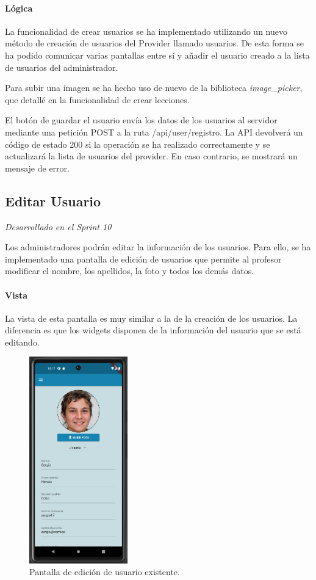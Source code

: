 \paragraph*{Lógica}
La funcionalidad de crear usuarios se ha implementado utilizando un nuevo método de creación de usuarios del Provider llamado usuarios. De esta forma
se ha podido comunicar varias pantallas entre sí y añadir el usuario creado a la lista de usuarios del administrador.


Para subir una imagen se ha hecho uso de nuevo de la biblioteca \textit{image\_picker}, que detallé en la funcionalidad de crear lecciones.

El botón de guardar el usuario envía los datos de los usuarios al servidor mediante una petición POST a la ruta /api/user/registro. La API devolverá un código de estado 200 si la operación se ha realizado correctamente y se actualizará la lista de usuarios del provider. En caso contrario, se mostrará un mensaje de error.


\subsection{Editar Usuario} 

\textit{Desarrollado en el Sprint 10}

Los administradores podrán editar la información de los usuarios. Para ello, se ha implementado una pantalla de edición de usuarios que permite al profesor modificar el nombre, los apellidos, la foto y todos los demás datos.

\paragraph*{Vista}
La vista de esta pantalla es muy similar a la de la creación de los usuarios. La diferencia es que los widgets disponen de la información del usuario que se está editando.

\begin{figure}[H]
  \centering
  \includegraphics[width=0.38\textwidth]{imagenes/c7/editarusuario.png}
  \caption{Pantalla de edición de usuario existente.} 
  \label{fig:edicion_usuario}
\end{figure}


